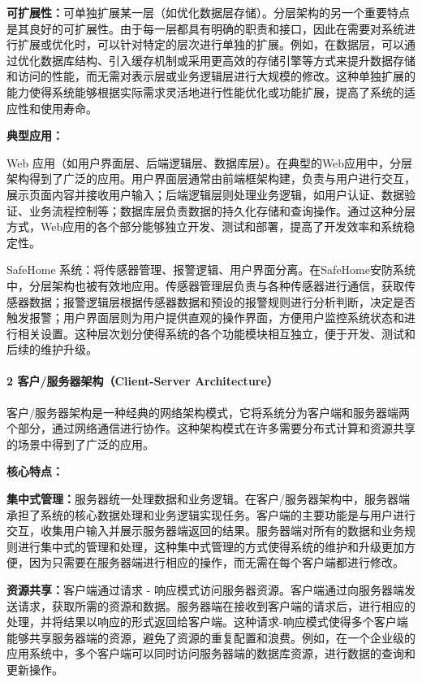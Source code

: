 \textbf{可扩展性：}可单独扩展某一层（如优化数据层存储）。分层架构的另一个重要特点是其良好的可扩展性。由于每一层都具有明确的职责和接口，因此在需要对系统进行扩展或优化时，可以针对特定的层次进行单独的扩展。例如，在数据层，可以通过优化数据库结构、引入缓存机制或采用更高效的存储引擎等方式来提升数据存储和访问的性能，而无需对表示层或业务逻辑层进行大规模的修改。这种单独扩展的能力使得系统能够根据实际需求灵活地进行性能优化或功能扩展，提高了系统的适应性和使用寿命。

\textbf{典型应用：}

Web 应用（如用户界面层、后端逻辑层、数据库层）。在典型的Web应用中，分层架构得到了广泛的应用。用户界面层通常由前端框架构建，负责与用户进行交互，展示页面内容并接收用户输入；后端逻辑层则处理业务逻辑，如用户认证、数据验证、业务流程控制等；数据库层负责数据的持久化存储和查询操作。通过这种分层方式，Web应用的各个部分能够独立开发、测试和部署，提高了开发效率和系统稳定性。

SafeHome 系统：将传感器管理、报警逻辑、用户界面分离。在SafeHome安防系统中，分层架构也被有效地应用。传感器管理层负责与各种传感器进行通信，获取传感器数据；报警逻辑层根据传感器数据和预设的报警规则进行分析判断，决定是否触发报警；用户界面层则为用户提供直观的操作界面，方便用户监控系统状态和进行相关设置。这种层次划分使得系统的各个功能模块相互独立，便于开发、测试和后续的维护升级。

\paragraph{2 客户/服务器架构（Client-Server Architecture）}\label{ux5ba2ux6237ux670dux52a1ux5668ux67b6ux6784client-server-architecture}

客户/服务器架构是一种经典的网络架构模式，它将系统分为客户端和服务器端两个部分，通过网络通信进行协作。这种架构模式在许多需要分布式计算和资源共享的场景中得到了广泛的应用。

\textbf{核心特点：}

\textbf{集中式管理：}服务器统一处理数据和业务逻辑。在客户/服务器架构中，服务器端承担了系统的核心数据处理和业务逻辑实现任务。客户端的主要功能是与用户进行交互，收集用户输入并展示服务器端返回的结果。服务器端对所有的数据和业务规则进行集中式的管理和处理，这种集中式管理的方式使得系统的维护和升级更加方便，因为只需要在服务器端进行相应的操作，而无需在每个客户端都进行修改。

\textbf{资源共享：}客户端通过请求 - 响应模式访问服务器资源。客户端通过向服务器端发送请求，获取所需的资源和数据。服务器端在接收到客户端的请求后，进行相应的处理，并将结果以响应的形式返回给客户端。这种请求-响应模式使得多个客户端能够共享服务器端的资源，避免了资源的重复配置和浪费。例如，在一个企业级的应用系统中，多个客户端可以同时访问服务器端的数据库资源，进行数据的查询和更新操作。

